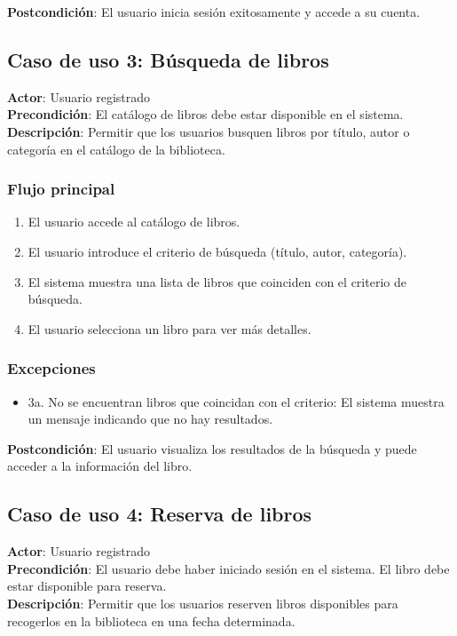 \documentclass{scrreprt}
\begin{document}
\textbf{Postcondición}: El usuario inicia sesión exitosamente y accede a su cuenta.

\subsection{Caso de uso 3: Búsqueda de libros}
\textbf{Actor}: Usuario registrado \\
\textbf{Precondición}: El catálogo de libros debe estar disponible en el sistema. \\
\textbf{Descripción}: Permitir que los usuarios busquen libros por título, autor o categoría en el catálogo de la biblioteca.

\subsubsection{Flujo principal}
\begin{enumerate}
    \item El usuario accede al catálogo de libros.
    \item El usuario introduce el criterio de búsqueda (título, autor, categoría).
    \item El sistema muestra una lista de libros que coinciden con el criterio de búsqueda.
    \item El usuario selecciona un libro para ver más detalles.
\end{enumerate}

\subsubsection{Excepciones}
\begin{itemize}
    \item 3a. No se encuentran libros que coincidan con el criterio: El sistema muestra un mensaje indicando que no hay resultados.
\end{itemize}

\textbf{Postcondición}: El usuario visualiza los resultados de la búsqueda y puede acceder a la información del libro.

\subsection{Caso de uso 4: Reserva de libros}
\textbf{Actor}: Usuario registrado \\
\textbf{Precondición}: El usuario debe haber iniciado sesión en el sistema. El libro debe estar disponible para reserva. \\
\textbf{Descripción}: Permitir que los usuarios reserven libros disponibles para recogerlos en la biblioteca en una fecha determinada.
\end{document}
